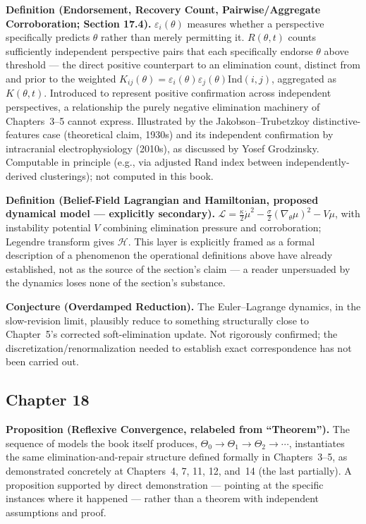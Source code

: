 \textbf{Definition (Endorsement, Recovery Count, Pairwise/Aggregate Corroboration; Section 17.4).} $\varepsilon_i(\theta)$ measures whether a perspective specifically predicts $\theta$ rather than merely permitting it. $R(\theta,t)$ counts sufficiently independent perspective pairs that each specifically endorse $\theta$ above threshold --- the direct positive counterpart to an elimination count, distinct from and prior to the weighted $K_{ij}(\theta) = \varepsilon_i(\theta)\varepsilon_j(\theta)\mathrm{Ind}(i,j)$, aggregated as $K(\theta,t)$. Introduced to represent positive confirmation across independent perspectives, a relationship the purely negative elimination machinery of Chapters~3--5 cannot express. Illustrated by the Jakobson--Trubetzkoy distinctive-features case (theoretical claim, 1930s) and its independent confirmation by intracranial electrophysiology (2010s), as discussed by Yosef Grodzinsky. Computable in principle (e.g., via adjusted Rand index between independently-derived clusterings); not computed in this book.

\textbf{Definition (Belief-Field Lagrangian and Hamiltonian, proposed dynamical model --- explicitly secondary).} $\mathcal{L} = \frac{\kappa}{2}\dot\mu^2 - \frac{\sigma}{2}(\nabla_\theta\mu)^2 - V\mu$, with instability potential $V$ combining elimination pressure and corroboration; Legendre transform gives $\mathcal{H}$. This layer is explicitly framed as a formal description of a phenomenon the operational definitions above have already established, not as the source of the section's claim --- a reader unpersuaded by the dynamics loses none of the section's substance.

\textbf{Conjecture (Overdamped Reduction).} The Euler--Lagrange dynamics, in the slow-revision limit, plausibly reduce to something structurally close to Chapter~5's corrected soft-elimination update. Not rigorously confirmed; the discretization/renormalization needed to establish exact correspondence has not been carried out.

\subsection*{Chapter 18}

\textbf{Proposition (Reflexive Convergence, relabeled from ``Theorem'').} The sequence of models the book itself produces, $\Theta_0 \to \Theta_1 \to \Theta_2 \to \cdots$, instantiates the same elimination-and-repair structure defined formally in Chapters~3--5, as demonstrated concretely at Chapters~4, 7, 11, 12, and~14 (the last partially). A proposition supported by direct demonstration --- pointing at the specific instances where it happened --- rather than a theorem with independent assumptions and proof.

